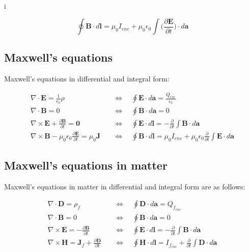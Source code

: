 i\documentclass[a4paper]{article}
\begin{document}
\begin{equation}
    \oint \bm{B}\cdot d\bm{l}=\mu_0I_{enc}+\mu_0\epsilon_0\int \bigg(\frac{\partial\bm{E}}{\partial t}\bigg)\cdot d\bm{a}
\end{equation}

\subsection{Maxwell's equations}

Maxwell's equations in differential and integral form:

\begin{align}
    \nabla\cdot\bm{E}=\frac{1}{\epsilon_0}\rho\quad &\Leftrightarrow\quad\oint \bm{E}\cdot d\bm{a}=\frac{Q_{enc}}{\epsilon_0} \\
    \nabla\cdot\bm{B}=0\quad &\Leftrightarrow\quad\oint\bm{B}\cdot d\bm{a}=0 \\ 
    \nabla\times\bm{E}+\frac{\partial\bm{B}}{\partial t}=\bm{0}\quad &\Leftrightarrow\quad\oint \bm{E}\cdot d\bm{l}=-\frac{\partial}{\partial t}\int \bm{B}\cdot d\bm{a} \\
    \nabla\times\bm{B}-\mu_0\epsilon_0\frac{\partial\bm{E}}{\partial t}=\mu_0\bm{J}\quad &\Leftrightarrow\quad\oint \bm{B}\cdot d\bm{l}=\mu_0I_{enc}+\mu_0\epsilon_0\frac{\partial}{\partial t}\int \bm{E}\cdot d\bm{a}
\end{align}

\subsection{Maxwell's equations in matter}

Maxwell's equations in matter in differential and integral form are as follows: 

\begin{align}
    \nabla\cdot\bm{D}=\rho_{f}\quad &\Leftrightarrow\quad\oint \bm{D}\cdot d\bm{a}=Q_{f_{enc}} \\
    \nabla\cdot\bm{B}=0\quad &\Leftrightarrow\quad\oint\bm{B}\cdot d\bm{a}=0 \\ 
    \nabla\times\bm{E}=-\frac{\partial\bm{B}}{\partial t}\quad &\Leftrightarrow\quad\oint \bm{E}\cdot d\bm{l}=-\frac{\partial}{\partial t}\int \bm{B}\cdot d\bm{a} \\
    \nabla\times\bm{H}=\bm{J}_{f}+\frac{\partial\bm{D}}{\partial t}\quad &\Leftrightarrow\quad\oint \bm{H}\cdot d\bm{l}=I_{f_{enc}}+\frac{\partial}{\partial t}\int \bm{D}\cdot d\bm{a}
\end{align}
\end{document}

